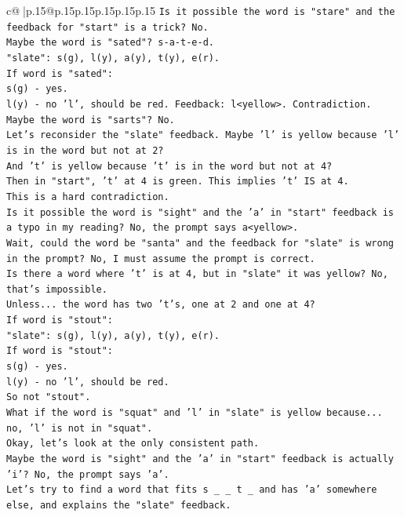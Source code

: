 \documentclass{article}
\begin{document}
{\begin{supertabular}{c@{$\;$}|p{.15\linewidth}@{}p{.15\linewidth}p{.15\linewidth}p{.15\linewidth}p{.15\linewidth}p{.15\linewidth}}
{{{\texttt{Is it possible the word is "stare" and the feedback for "start" is a trick? No.} \\
\texttt{Maybe the word is "sated"? s{-}a{-}t{-}e{-}d.} \\
\texttt{"slate": s(g), l(y), a(y), t(y), e(r).} \\
\texttt{If word is "sated":} \\
\texttt{s(g) {-} yes.} \\
\texttt{l(y) {-} no 'l', should be red. Feedback: l<yellow>. Contradiction.} \\
\texttt{Maybe the word is "sarts"? No.} \\
\texttt{Let's reconsider the "slate" feedback. Maybe 'l' is yellow because 'l' is in the word but not at 2?} \\
\texttt{And 't' is yellow because 't' is in the word but not at 4?} \\
\texttt{Then in "start", 't' at 4 is green. This implies 't' IS at 4.} \\
\texttt{This is a hard contradiction.} \\
\texttt{Is it possible the word is "sight" and the 'a' in "start" feedback is a typo in my reading? No, the prompt says a<yellow>.} \\
\texttt{Wait, could the word be "santa" and the feedback for "slate" is wrong in the prompt? No, I must assume the prompt is correct.} \\
\texttt{Is there a word where 't' is at 4, but in "slate" it was yellow? No, that's impossible.} \\
\texttt{Unless... the word has two 't's, one at 2 and one at 4?} \\
\texttt{If word is "stout":} \\
\texttt{"slate": s(g), l(y), a(y), t(y), e(r).} \\
\texttt{If word is "stout":} \\
\texttt{s(g) {-} yes.} \\
\texttt{l(y) {-} no 'l', should be red.} \\
\texttt{So not "stout".} \\
\texttt{What if the word is "squat" and 'l' in "slate" is yellow because... no, 'l' is not in "squat".} \\
\texttt{Okay, let's look at the only consistent path.} \\
\texttt{Maybe the word is "sight" and the 'a' in "start" feedback is actually 'i'? No, the prompt says 'a'.} \\
\texttt{Let's try to find a word that fits s \_ \_ t \_ and has 'a' somewhere else, and explains the "slate" feedback.} \\
}}}
\end{supertabular}}
\end{document}
